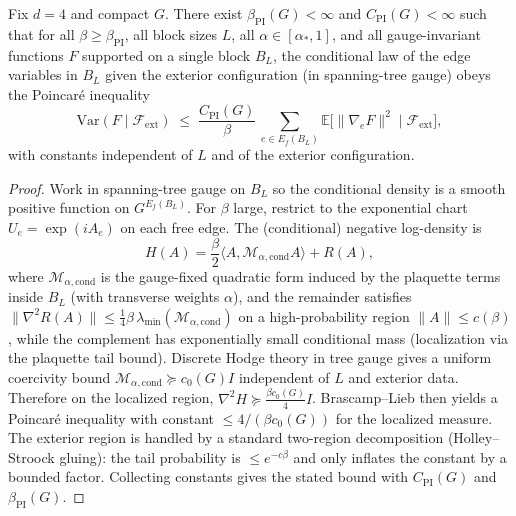 \begin{lemma}\label{lem:block_cond_poincare}
Fix $d=4$ and compact $G$. There exist $\beta_{\mathrm{PI}}(G)<\infty$ and $C_{\mathrm{PI}}(G)<\infty$ such that for all
$\beta\ge\beta_{\mathrm{PI}}$, all block sizes $L$, all $\alpha\in[\alpha_*,1]$, and all gauge-invariant functions $F$ supported
on a single block $B_L$, the conditional law of the edge variables in $B_L$ given the exterior configuration (in spanning-tree gauge)
obeys the Poincar\'e inequality
\[
\mathrm{Var}(F\mid \mathcal F_{\mathrm{ext}})
\;\le\; \frac{C_{\mathrm{PI}}(G)}{\beta}\,\sum_{e\in E_f(B_L)} \mathbb E\big[\|\nabla_e F\|^2\mid \mathcal F_{\mathrm{ext}}\big],
\]
with constants independent of $L$ and of the exterior configuration.
\end{lemma}

\begin{proof}
Work in spanning-tree gauge on $B_L$ so the conditional density is a smooth positive function on $G^{E_f(B_L)}$.
For $\beta$ large, restrict to the exponential chart $U_e=\exp(iA_e)$ on each free edge. The (conditional) negative log-density is
\[
H(A)=\frac{\beta}{2}\langle A,\mathcal M_{\alpha,\mathrm{cond}} A\rangle + R(A),
\]
where $\mathcal M_{\alpha,\mathrm{cond}}$ is the gauge-fixed quadratic form induced by the plaquette terms inside $B_L$ (with transverse weights $\alpha$),
and the remainder satisfies $\|\nabla^2 R(A)\|\le \tfrac{1}{4}\beta\,\lambda_{\min}(\mathcal M_{\alpha,\mathrm{cond}})$ on a high-probability region
$\|A\|\le c(\beta)$, while the complement has exponentially small conditional mass (localization via the plaquette tail bound).
Discrete Hodge theory in tree gauge gives a uniform coercivity bound
$\mathcal M_{\alpha,\mathrm{cond}}\succeq c_0(G) I$ independent of $L$ and exterior data.
Therefore on the localized region,
$\nabla^2 H\succeq \tfrac{\beta c_0(G)}{4} I$.
Brascamp--Lieb then yields a Poincar\'e inequality with constant $\le 4/(\beta c_0(G))$ for the localized measure.
The exterior region is handled by a standard two-region decomposition (Holley--Stroock gluing): the tail probability is
$\le e^{-c\beta}$ and only inflates the constant by a bounded factor.
Collecting constants gives the stated bound with $C_{\mathrm{PI}}(G)$ and $\beta_{\mathrm{PI}}(G)$.
\end{proof}

